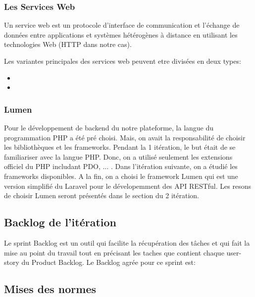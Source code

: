 \subsubsection{Les Services Web}

Un service web est un protocole d'interface de communication et l'échange de
données entre applications et systèmes hétérogènes à distance en utilisant les
technologies Web (HTTP dans notre cas).

Les variantes principales des services web peuvent etre divisées en deux types:
\begin{itemize}
        \item {}
        \item {}
\end{itemize}

\subsubsection{Lumen}

Pour le développement de backend du notre plateforme, la langue du programmation
PHP a été pré choisi. Mais, on avait la responsabilité de choisir les
bibliothèques et les frameworks. Pendant la 1\iere{} itération, le but était de
se familiariser avec la langue PHP. Donc, on a utilisé seulement les extensions
officiel du PHP includant PDO, $\dotsc$ . Dans l'itération suivante, on a étudié
les frameworks disponibles. A la fin, on a choisi le framework Lumen qui est
une version simplifié du Laravel pour le dévelopemment des API \acrshort{RESTful}. Les
resons de choisir Lumen seront présentés dans le section du 2\ieme{} itération.

\subsection{Backlog de l'itération}

Le sprint Backlog est un outil qui facilite la récupération des tâches et qui fait
la mise au point du travail tout en précisant les taches que contient chaque
user-story du Product Backlog.
Le Backlog agrée pour ce sprint est:


\subsection{Mises des normes}

